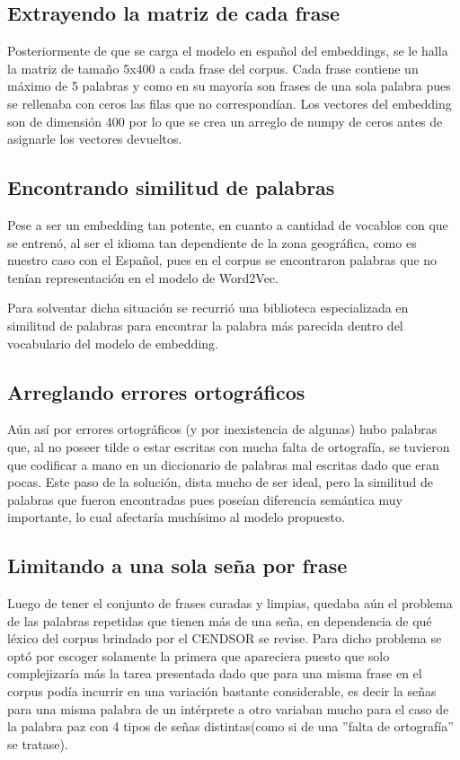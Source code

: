 \subsection{Extrayendo la matriz de cada frase}
Posteriormente de que se carga el modelo en español del embeddings, se le halla la matriz de tamaño 5x400 a cada frase del corpus. Cada frase contiene un máximo de 5 palabras y como en su mayoría son frases de una sola palabra pues se rellenaba con ceros las filas que no correspondían. Los vectores del embedding son de dimensión 400 por lo que se crea un arreglo de numpy de ceros antes de asignarle los vectores devueltos. 
\subsection{Encontrando similitud de palabras}
Pese a ser un embedding tan potente, en cuanto a cantidad de vocablos con que se entrenó, al ser el idioma tan dependiente de la zona geográfica, como es nuestro caso con el Español, pues en el corpus se encontraron palabras que no tenían representación en el modelo de Word2Vec.

Para solventar dicha situación se recurrió una biblioteca especializada en similitud de palabras para encontrar la palabra más parecida dentro del vocabulario del modelo de embedding.
\subsection{Arreglando errores ortográficos}

Aún así por errores ortográficos (y por inexistencia de algunas) hubo palabras que, al no poseer tilde o estar escritas con mucha falta de ortografía, se tuvieron que codificar a mano en un diccionario de palabras mal escritas dado que eran pocas. Este paso de la solución, dista mucho de ser ideal, pero la similitud de palabras que fueron encontradas pues poseían diferencia semántica muy importante, lo cual afectaría muchísimo al modelo propuesto.

\subsection{Limitando a una sola seña por frase}
Luego de tener el conjunto de frases curadas y limpias, quedaba aún el problema de las palabras repetidas que tienen más de una seña, en dependencia de qué léxico del corpus brindado por el CENDSOR se revise.
Para dicho problema se optó por escoger solamente la primera que apareciera puesto que solo complejizaría más la tarea presentada dado que para una misma frase en el corpus podía incurrir en una variación bastante considerable, es decir la señas para una misma palabra de un intérprete a otro variaban mucho para el caso de la palabra paz con 4 tipos de señas distintas(como si de una ''falta de ortografía'' se tratase). 

